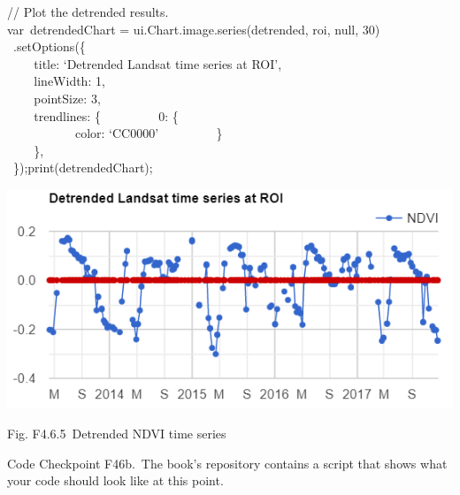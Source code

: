 \documentclass[
  letterpaper,
  DIV=11,
  numbers=noendperiod]{scrreprt}
\begin{document}
// Plot the detrended results.\\
var~detrendedChart = ui.Chart.image.series(detrended, roi, null, 30)\\
\hspace*{0.333em} ~.setOptions(\{\\
\hspace*{0.333em} ~ ~ ~title: `Detrended Landsat time series at ROI',\\
\hspace*{0.333em} ~ ~ ~lineWidth: 1,\\
\hspace*{0.333em} ~ ~ ~pointSize: 3,\\
\hspace*{0.333em} ~ ~ ~trendlines: \{~ ~ ~ ~ ~ ~0: \{\\
\hspace*{0.333em} ~ ~ ~ ~ ~ ~ ~color: `CC0000'~ ~ ~ ~ ~ ~\}\\
\hspace*{0.333em} ~ ~ ~\},\\
\hspace*{0.333em} ~\});print(detrendedChart);

\includegraphics{./F4/image20.png}

Fig. F4.6.5~Detrended NDVI time series

\begin{tcolorbox}[enhanced jigsaw, left=2mm, breakable, rightrule=.15mm, opacityback=0, colframe=quarto-callout-note-color-frame, colbacktitle=quarto-callout-note-color!10!white, arc=.35mm, opacitybacktitle=0.6, toptitle=1mm, colback=white, leftrule=.75mm, title=\textcolor{quarto-callout-note-color}{\faInfo}\hspace{0.5em}{Note}, toprule=.15mm, bottomtitle=1mm, titlerule=0mm, bottomrule=.15mm, coltitle=black]

Code Checkpoint F46b.~The book's repository contains a script that shows
what your code should look like at this point.

\end{tcolorbox}
\end{document}
